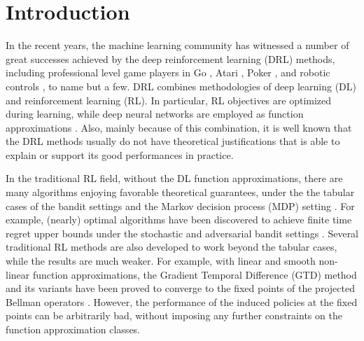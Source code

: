 \section{Introduction}
\label{sec:introduction}

In the recent years, the machine learning community has witnessed a number of great successes achieved by the deep reinforcement learning (DRL) methods, including professional level game players in Go \citep{silver2016masteringA,silver2017masteringB}, Atari \citep{mnih2015human}, Poker \citep{moravvcik2017deepstack}, and robotic controls \citep{lillicrap2015continuous,levine2016end}, to name but a few. DRL combines methodologies of deep learning (DL) and reinforcement learning (RL). In particular, RL objectives are optimized during learning, while deep neural networks are employed as function approximations \citep{sutton2018reinforcement}. Also, mainly because of this combination, it is well known that the DRL methods usually do not have theoretical justifications that is able to explain or support its good performances in practice.

In the traditional RL field, without the DL function approximations, there are many algorithms enjoying favorable theoretical guarantees, under the the tabular cases of the bandit settings and the Markov decision process (MDP) setting \citep{sutton2018reinforcement}. For example, (nearly) optimal algorithms have been discovered to achieve finite time regret upper bounds under the stochastic and adversarial bandit settings \citep{bubeck2012regret}. Several traditional RL methods are also developed to work beyond the tabular cases, while the results are much weaker. For example, with linear and smooth non-linear function approximations, the Gradient Temporal Difference (GTD) method and its variants have been proved to converge to the fixed points of the projected Bellman operators \citep{sutton2009fast,sutton2009convergent,bhatnagar2009convergent}. However, the performance of the induced policies at the fixed points can be arbitrarily bad, without imposing any further constraints on the function approximation classes.

